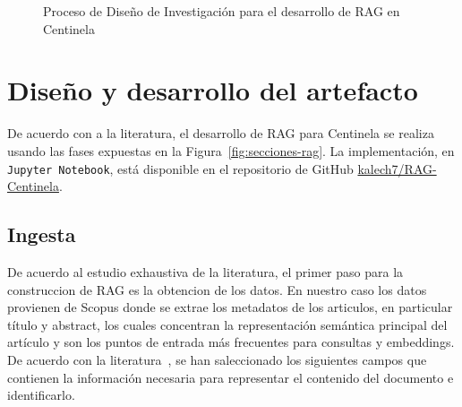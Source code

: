 \begin{landscape}
\begin{figure}[ht]
{
    }
    \caption{Proceso de Diseño de Investigación para el desarrollo de RAG en Centinela}
    \label{fig: DSR}
\end{figure}
\end{landscape}

\section{Diseño y desarrollo del artefacto}
De acuerdo con a la literatura, el desarrollo de RAG para Centinela se realiza usando las fases expuestas en la Figura~\ref{fig:secciones-rag}. La implementación,
en \texttt{Jupyter Notebook}, está disponible en el repositorio de GitHub \href{https://github.com/kalech7/RAG-Centinela}{kalech7/RAG-Centinela}.

\subsection{Ingesta} 
De acuerdo al estudio exhaustiva de la literatura, el primer paso para la construccion de RAG es la obtencion de los datos. En nuestro caso
los datos provienen de Scopus donde se extrae los metadatos de los articulos, en particular título y abstract, los cuales concentran la representación semántica principal del artículo y son los puntos 
de entrada más frecuentes para consultas y embeddings\parencite{zhai2024llmIR}. De acuerdo con la literatura~\parencite{zhai2024llmIR,knollmeyer2024benchmarking,fan2021pretraining,ibrihich2022review,bernard2025fate,ma2025vector}, se han saleccionado los siguientes campos que 
contienen la información necesaria para representar el contenido del documento e identificarlo.

